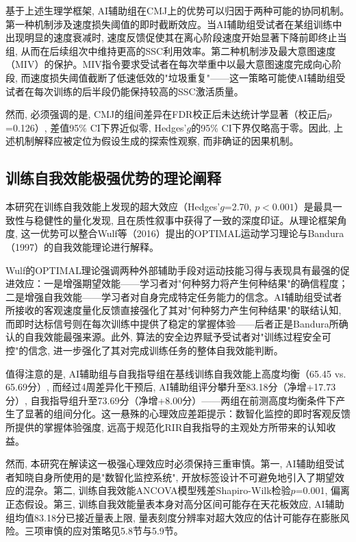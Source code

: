 基于上述生理学框架, AI辅助组在CMJ上的优势可以归因于两种可能的协同机制。第一种机制涉及速度损失阈值的即时截断效应。当AI辅助组受试者在某组训练中出现明显的速度衰减时, 速度反馈促使其在离心阶段速度开始显著下降前即终止当组, 从而在后续组次中维持更高的SSC利用效率。第二种机制涉及最大意图速度（MIV）的保护。MIV指令要求受试者在每次举重中以最大意图速度完成向心阶段, 而速度损失阈值截断了低速低效的"垃圾重复"——这一策略可能使AI辅助组受试者在每次训练的后半段仍能保持较高的SSC激活质量。

然而, 必须强调的是, CMJ的组间差异在FDR校正后未达统计学显著（校正后$p$=0.126）, 差值95\% CI下界近似零, Hedges'$g$的95\% CI下界仅略高于零。因此, 上述机制解释应被定位为假设生成的探索性观察, 而非确证的因果机制。

\subsection{训练自我效能极强优势的理论阐释}
\label{sec:self_efficacy_theory}

本研究在训练自我效能上发现的超大效应（Hedges'$g$=2.70, $p<0.001$）是最具一致性与稳健性的量化发现, 且在质性叙事中获得了一致的深度印证。从理论框架角度, 这一优势可以整合Wulf等（2016）提出的OPTIMAL运动学习理论与Bandura（1997）的自我效能理论进行解释。

Wulf的OPTIMAL理论强调两种外部辅助手段对运动技能习得与表现具有最强的促进效应：一是增强期望效能——学习者对"何种努力将产生何种结果"的确信程度；二是增强自我效能——学习者对自身完成特定任务能力的信念。AI辅助组受试者所接收的客观速度量化反馈直接强化了其对"何种努力产生何种结果"的联结认知, 而即时达标信号则在每次训练中提供了稳定的掌握体验——后者正是Bandura所确认的自我效能最强来源。此外, 算法的安全边界赋予受试者对"训练过程安全可控"的信念, 进一步强化了其对完成训练任务的整体自我效能判断。

值得注意的是, AI辅助组与自我指导组在基线训练自我效能上高度均衡（65.45 vs. 65.69分）, 而经过4周差异化干预后, AI辅助组评分攀升至83.18分（净增+17.73分）, 自我指导组升至73.69分（净增+8.00分）——两组在前测高度均衡条件下产生了显著的组间分化。这一悬殊的心理效应差距提示：数智化监控的即时客观反馈所提供的掌握体验强度, 远高于规范化RIR自我指导的主观处方所带来的认知收益。

然而, 本研究在解读这一极强心理效应时必须保持三重审慎。第一, AI辅助组受试者知晓自身所使用的是"数智化监控系统", 开放标签设计不可避免地引入了期望效应的混杂。第二, 训练自我效能ANCOVA模型残差Shapiro-Wilk检验$p$=0.001, 偏离正态假设。第三, 训练自我效能量表本身对高分区间可能存在天花板效应, AI辅助组均值83.18分已接近量表上限, 量表刻度分辨率对超大效应的估计可能存在膨胀风险。三项审慎的应对策略见5.8节与5.9节。

